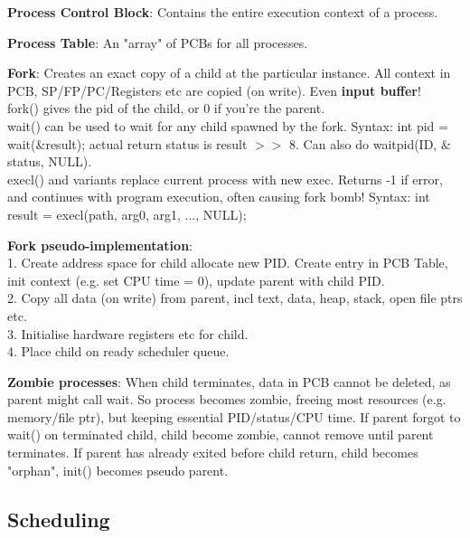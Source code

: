 \documentclass[a4paper,landscape]{article}
\newcommand{\rntopic}[1]{\vspace{-1.5em}\subsection*{#1}\vspace{-0.5em}}
\newcommand{\rnname}[1]{\textbf{#1}}
\begin{document}
\begin{multicols*}{4}
\begin{flatitemize}
\item \rnname{Process Control Block}: Contains the entire execution context of a process. 
\item \rnname{Process Table}: An "array" of PCBs for all processes.
\item \rnname{Fork}: Creates an exact copy of a child at the particular instance. All context in PCB, SP/FP/PC/Registers etc are copied (on write). Even \textbf{input buffer}! \\
fork() gives the pid of the child, or 0 if you're the parent. \\
wait() can be used to wait for any child spawned by the fork. Syntax: int pid = wait($\&$result); actual return status is result $>>$ 8. Can also do waitpid(ID, $\&$status, NULL). \\
execl() and variants replace current process with new exec. Returns -1 if error, and continues with program execution, often causing fork bomb! Syntax: int result = execl(path, arg0, arg1, ..., NULL);
\item \rnname{Fork pseudo-implementation}:\\
1. Create address space for child allocate new PID. Create entry in PCB Table, init context (e.g. set CPU time = 0), update parent with child PID.\\
2. Copy all data (on write) from parent, incl text, data, heap, stack, open file ptrs etc.\\
3. Initialise hardware registers etc for child.\\
4. Place child on ready scheduler queue.
\item \rnname{Zombie processes}: When child terminates, data in PCB cannot be deleted, as parent might call wait. So process becomes zombie, freeing most resources (e.g. memory/file ptr), but keeping essential PID/status/CPU time. If parent forgot to wait() on terminated child, child become zombie, cannot remove until parent terminates. If parent has already exited before child return, child becomes "orphan", init() becomes pseudo parent. 
\end{flatitemize}
\rntopic{Scheduling}
\begin{flatitemize}


\end{flatitemize}
\end{multicols*}
\end{document}

